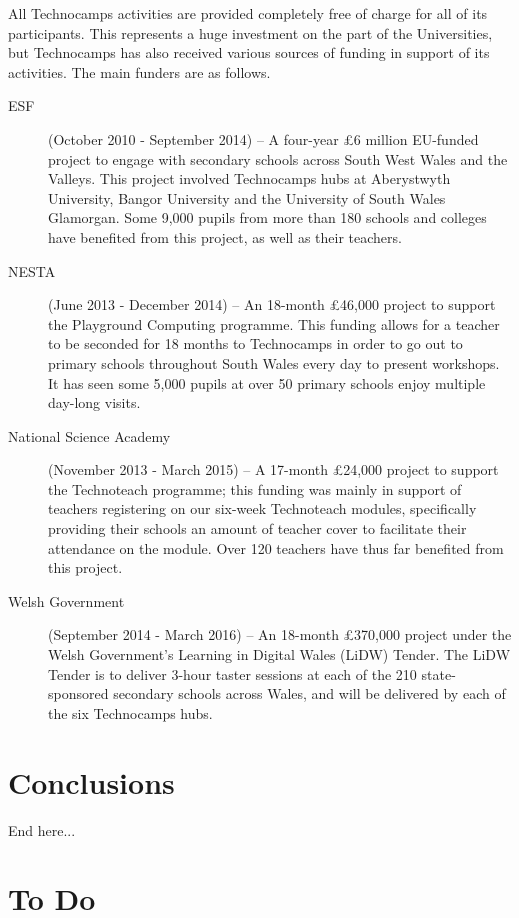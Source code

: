 \documentclass{sig-alternate}
\begin{document}
All Technocamps activities are provided completely free of charge
for all of its participants. This represents a huge investment
on the part of the Universities, but Technocamps has also received
various sources of funding in support of its activities.
The main funders are as follows.
\begin{description}
\item[ESF] (October 2010 - September 2014) --
A four-year \pounds 6 million EU-funded project to engage with secondary schools across South West Wales and the Valleys. This project involved Technocamps hubs at Aberystwyth University, Bangor University and the University of South Wales Glamorgan. Some 9,000 pupils from more than 180 schools and colleges have benefited from this project, as well as their teachers.
\item[NESTA] (June 2013 - December 2014) --
An 18-month \pounds 46,000 project to support the Playground Computing programme. This funding allows for a teacher to be seconded for 18 months to Technocamps in order to go out to primary schools throughout South Wales every day to present workshops. It has seen some 5,000 pupils at over 50 primary schools enjoy multiple day-long visits.
\item[National Science Academy] (November 2013 - March 2015) --
A 17-month \pounds 24,000 project to support the Technoteach programme; this funding was mainly in support of teachers registering on our six-week Technoteach modules, specifically providing their schools an amount of teacher cover to facilitate their attendance on the module. Over 120 teachers have thus far benefited from this project.
\item[Welsh Government] (September 2014 - March 2016) --
An 18-month \pounds 370,000 project under the Welsh Government's Learning in Digital Wales (LiDW) Tender. The LiDW Tender is to deliver 3-hour taster sessions at each of the 210 state-sponsored secondary schools across Wales, and will be delivered by each of the six Technocamps hubs.
\end{description}

\section{Conclusions}
End here...






\section*{To Do}
\end{document}
